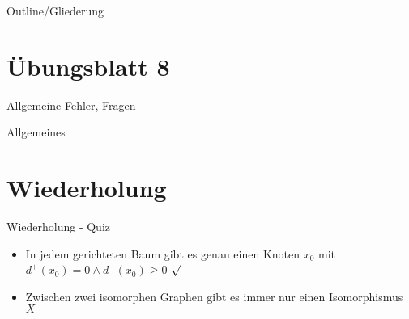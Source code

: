 
\subtitle{Foliensatz 8}
\date{13. Dezember 2012}



\begin{frame}
    \titlepage
\end{frame}

\begin{frame}{Outline/Gliederung}
    \tableofcontents
\end{frame}

\section{Übungsblatt 8}
\begin{frame}{Allgemeine Fehler, Fragen}
    \begin{block}{Allgemeines}
        \begin{itemize}
        \end{itemize}
    \end{block}
\end{frame}

\section{Wiederholung}
\begin{frame} {Wiederholung - Quiz}
    \begin{itemize}
        \item In jedem gerichteten Baum gibt es genau einen Knoten $x_0$ mit
$d^{+}(x_0) = 0 \land d^{−}(x_0) \geq 0$
         {\color{darkgreen}$\surd$}\\
        \color{black}
        
        \item Zwischen zwei isomorphen Graphen gibt es immer nur einen Isomorphismus
         {\color{red}$X$}\\
        \color{black}
    \end{itemize}
\end{frame}

